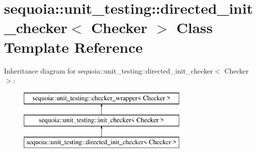 \hypertarget{classsequoia_1_1unit__testing_1_1directed__init__checker}{}\section{sequoia\+::unit\+\_\+testing\+::directed\+\_\+init\+\_\+checker$<$ Checker $>$ Class Template Reference}
\label{classsequoia_1_1unit__testing_1_1directed__init__checker}
Inheritance diagram for sequoia\+::unit\+\_\+testing\+::directed\+\_\+init\+\_\+checker$<$ Checker $>$\+:\begin{figure}[H]
\begin{center}
\leavevmode
\includegraphics[height=3.000000cm]{classsequoia_1_1unit__testing_1_1directed__init__checker}
\end{center}
\end{figure}
